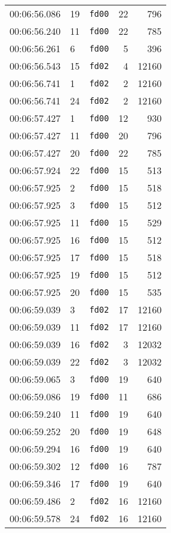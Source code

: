 \documentclass{article}
\begin{document}
\begin{longtable}{lllrr}
00:06:56.086 & 19 & \texttt{fd00} & 22 & 796 \\
00:06:56.240 & 11 & \texttt{fd00} & 22 & 785 \\
00:06:56.261 & 6 & \texttt{fd00} & 5 & 396 \\
00:06:56.543 & 15 & \texttt{fd02} & 4 & 12160 \\
00:06:56.741 & 1 & \texttt{fd02} & 2 & 12160 \\
00:06:56.741 & 24 & \texttt{fd02} & 2 & 12160 \\
00:06:57.427 & 1 & \texttt{fd00} & 12 & 930 \\
00:06:57.427 & 11 & \texttt{fd00} & 20 & 796 \\
00:06:57.427 & 20 & \texttt{fd00} & 22 & 785 \\
00:06:57.924 & 22 & \texttt{fd00} & 15 & 513 \\
00:06:57.925 & 2 & \texttt{fd00} & 15 & 518 \\
00:06:57.925 & 3 & \texttt{fd00} & 15 & 512 \\
00:06:57.925 & 11 & \texttt{fd00} & 15 & 529 \\
00:06:57.925 & 16 & \texttt{fd00} & 15 & 512 \\
00:06:57.925 & 17 & \texttt{fd00} & 15 & 518 \\
00:06:57.925 & 19 & \texttt{fd00} & 15 & 512 \\
00:06:57.925 & 20 & \texttt{fd00} & 15 & 535 \\
00:06:59.039 & 3 & \texttt{fd02} & 17 & 12160 \\
00:06:59.039 & 11 & \texttt{fd02} & 17 & 12160 \\
00:06:59.039 & 16 & \texttt{fd02} & 3 & 12032 \\
00:06:59.039 & 22 & \texttt{fd02} & 3 & 12032 \\
00:06:59.065 & 3 & \texttt{fd00} & 19 & 640 \\
00:06:59.086 & 19 & \texttt{fd00} & 11 & 686 \\
00:06:59.240 & 11 & \texttt{fd00} & 19 & 640 \\
00:06:59.252 & 20 & \texttt{fd00} & 19 & 648 \\
00:06:59.294 & 16 & \texttt{fd00} & 19 & 640 \\
00:06:59.302 & 12 & \texttt{fd00} & 16 & 787 \\
00:06:59.346 & 17 & \texttt{fd00} & 19 & 640 \\
00:06:59.486 & 2 & \texttt{fd02} & 16 & 12160 \\
00:06:59.578 & 24 & \texttt{fd02} & 16 & 12160 \\

\end{longtable}
\end{document}
